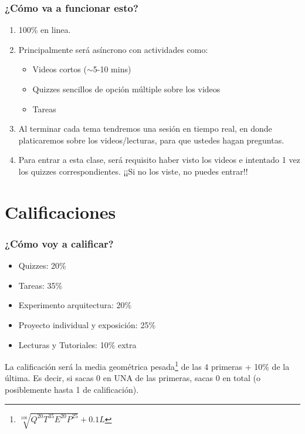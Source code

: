 \documentclass[spanish]{beamer}
\def\tcr#1{\textcolor{MyRed}{#1}}
\def\tcb#1{\textcolor{MyBlue}{#1}}
\def\tcg#1{\textcolor{MyGreen}{#1}}
\def\tcp#1{\textcolor{MyPurple}{#1}}
\begin{document}
\begin{frame}\frametitle{¿Cómo va a funcionar esto?}
\begin{enumerate}
 \item 100\% en linea. \pause
 \item Principalmente será \tcg{asíncrono} con actividades como:
 \begin{itemize}
    \item Videos cortos ($\sim$5-10 mins)
    \item Quizzes sencillos de opción múltiple sobre los videos
    \item Tareas
 \end{itemize}\pause
 \item Al terminar cada tema tendremos una sesión \tcp{en tiempo real}, en donde platicaremos sobre los videos/lecturas, para que ustedes hagan preguntas.\pause
 \item Para entrar a esta clase, \tcb{será requisito haber visto los videos e intentado 1 vez los quizzes correspondientes}. \tcr{¡¡Si no los viste, no puedes entrar!!}
\end{enumerate}
\end{frame}

\section{Calificaciones}

\begin{frame}\frametitle{¿Cómo voy a calificar?}
	\begin{itemize}
		\item Quizzes: 20\%
		\item Tareas: 35\%
		\item Experimento arquitectura: 20\%
		\item Proyecto individual y exposición: 25\%
		\item \scriptsize{Lecturas y Tutoriales: 10\% extra}
	\end{itemize}
	\pause
	La calificación será \tcg{la media geométrica pesada}\footnote{$\sqrt[100]{Q^{20}T^{35}E^{20}P^{25}} + 0.1 L$} de las 4 primeras + 10\% de la última. Es decir, si sacas 0 en UNA de las primeras, sacas 0 en total (o posiblemente hasta 1 de calificación).
\end{frame}
\end{document}
